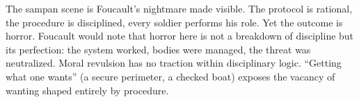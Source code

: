 The sampan scene is Foucault's nightmare made visible. The protocol is rational, the procedure
is disciplined, every soldier performs his role. Yet the outcome is horror. Foucault would note
that horror here is not a breakdown of discipline but its perfection: the system worked, bodies
were managed, the threat was neutralized. Moral revulsion has no traction within disciplinary
logic. ``Getting what one wants'' (a secure perimeter, a checked boat) exposes the vacancy of
wanting shaped entirely by procedure.
